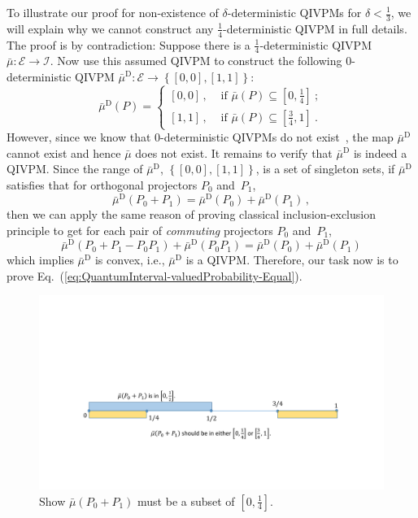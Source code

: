 \documentclass[english,reprint, aps, prl,superscriptaddress, showpacs,
showkeys, longbibliography, amsmath, amssymb, floatfix]{revtex4-1}
\theoremstyle{plain}
\theoremstyle{definition}
\newcommand{\events}{\ensuremath{\mathcal{E}}}
\newcommand{\imposs}{\ensuremath{\left[0,0\right]}}
\newcommand{\necess}{\ensuremath{\left[1,1\right]}}
\begin{document}
To illustrate our proof for non-existence of $\delta$-deterministic
QIVPMs for $\delta<\frac{1}{3}$, we will explain why we cannot construct
any $\frac{1}{4}$-deterministic QIVPM in full details. The proof
is by contradiction: Suppose there is a $\frac{1}{4}$-deterministic
QIVPM~$\bar{\mu}:\events\rightarrow\mathscr{I}$. Now use this assumed
QIVPM to construct the following $0$-deterministic QIVPM $\bar{\mu}^{\textrm{D}}:\events\rightarrow\left\{ \imposs,\necess\right\} $:
\begin{equation}
\bar{\mu}^{\textrm{D}}\left(P\right)=\begin{cases}
\imposs\,, & \textrm{ if }\bar{\mu}\left(P\right)\subseteq\left[0,\tfrac{1}{4}\right]\:;\\
\necess\,, & \textrm{ if }\bar{\mu}\left(P\right)\subseteq\left[\tfrac{3}{4},1\right]\:.
\end{cases}
\end{equation}
However, since we know that $0$-deterministic QIVPMs do not exist~\cite{THOS2017},
the map $\bar{\mu}^{\textrm{D}}$ cannot exist and hence $\bar{\mu}$
does not exist. It remains to verify that $\bar{\mu}^{\textrm{D}}$
is indeed a QIVPM. Since the range of $\bar{\mu}^{\textrm{D}}$, $\left\{ \imposs,\necess\right\} $,
is a set of singleton sets, if $\bar{\mu}^{\textrm{D}}$ satisfies
that for orthogonal projectors $P_{0}$ and~$P_{1}$, 
\begin{equation}
\bar{\mu}^{\textrm{D}}\left(P_{0}+P_{1}\right)=\bar{\mu}^{\textrm{D}}\left(P_{0}\right)+\bar{\mu}^{\textrm{D}}\left(P_{1}\right)\,,\label{eq:QuantumInterval-valuedProbability-Equal}
\end{equation}
then we can apply the same reason of proving classical inclusion-exclusion
principle to get for each pair of \emph{commuting} projectors $P_{0}$
and~$P_{1}$, 
\[
\bar{\mu}^{\textrm{D}}\left(P_{0}+P_{1}-P_{0}P_{1}\right)+\bar{\mu}^{\textrm{D}}\left(P_{0}P_{1}\right)=\bar{\mu}^{\textrm{D}}\left(P_{0}\right)+\bar{\mu}^{\textrm{D}}\left(P_{1}\right)
\]
which implies $\bar{\mu}^{\textrm{D}}$ is convex, i.e., $\bar{\mu}^{\textrm{D}}$
is a QIVPM. Therefore, our task now is to prove Eq.~(\ref{eq:QuantumInterval-valuedProbability-Equal}).

\begin{figure}
\includegraphics[bb=50bp 100bp 900bp 300bp,clip,scale=0.5]{prop_prop_letter_ajhs_referee_response_pptx}\caption{\label{fig:Show-subset}Show $\bar{\mu}\left(P_{0}+P_{1}\right)$
must be a subset of $\left[0,\frac{1}{4}\right]$.}
\end{figure}
\end{document}
